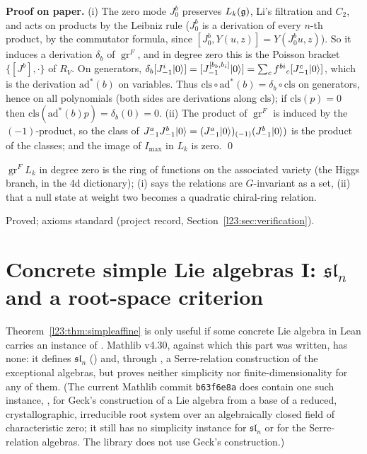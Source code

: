 \textbf{Proof on paper.} (i) The zero mode $J^b_0$ preserves $L_k(\mathfrak g)$, Li's filtration and $C_2$, and acts on products by the
Leibniz rule ($J^b_0$ is a derivation of every $n$-th product, by the commutator formula, since $[J^b_0,Y(u,z)]=Y(J^b_0u,z)$). So it
induces a derivation $\delta_b$ of $\operatorname{gr}^F$, and in degree zero this is the Poisson bracket $\{[J^b],\cdot\}$ of $R_V$. On
generators, $\delta_b[J^i_{-1}|0\rangle]=[J^{[b_b,b_i]}_{-1}|0\rangle]=\sum_cf^{bi}{}_c[J^c_{-1}|0\rangle]$, which is the derivation
$\mathrm{ad}^*(b)$ on variables. Thus $\mathrm{cls}\circ\mathrm{ad}^*(b)=\delta_b\circ\mathrm{cls}$ on generators, hence on all
polynomials (both sides are derivations along $\mathrm{cls}$); if $\mathrm{cls}(p)=0$ then $\mathrm{cls}(\mathrm{ad}^*(b)p)=\delta_b(0)=0$.
(ii) The product of $\operatorname{gr}^F$ is induced by the $(-1)$-product, so the class of $J^a_{-1}J^b_{-1}|0\rangle=(J^a_{-1}|0\rangle)_{(-1)}(J^b_{-1}|0\rangle)$
is the product of the classes; and the image of $I_{\max}$ in $L_k$ is zero. \qed

\begin{physics}
$\operatorname{gr}^F L_k$ in degree zero is the ring of functions on the associated variety (the Higgs branch, in the 4d
dictionary); (i) says the relations are $G$-invariant as a set, (ii) that a null state at weight two becomes a quadratic
chiral-ring relation.
\end{physics}

\begin{status}
Proved; axioms standard (project record, Section~\ref{l23:sec:verification}).
\end{status}

\section{Concrete simple Lie algebras I: \texorpdfstring{$\mathfrak{sl}_n$}{sl(n)} and a root-space criterion}\label{l23:sec:sln}

Theorem~\ref{l23:thm:simpleaffine} is only useful if some concrete Lie algebra in Lean carries an instance of
. Mathlib v4.30, against which this part was written, has none: it defines $\mathfrak{sl}_n$
() and, through , a Serre-relation construction of the exceptional
algebras, but proves neither simplicity nor finite-dimensionality for any of them. (The current Mathlib commit
\texttt{b63f6e8a} does contain one such instance, , for Geck's construction
 of a Lie algebra from a base  of a reduced, crystallographic,
irreducible root system over an algebraically closed field  of characteristic zero; it still has no
simplicity instance for $\mathfrak{sl}_n$ or for the Serre-relation algebras. The library does not use Geck's
construction.)

